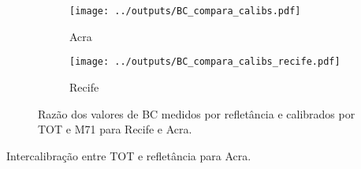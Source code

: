 \begin{figure}[H]
	\centering
	\begin{subfigure}[b]{0.43\linewidth}
		\texttt{[image: ../outputs/BC\_compara\_calibs.pdf]}
		\caption{Acra \label{fig:razaoTOTM71}}
	\end{subfigure}
		\hspace{0.3cm}
	\begin{subfigure}[b]{0.43\linewidth}
		\texttt{[image: ../outputs/BC\_compara\_calibs\_recife.pdf]}
		\caption{Recife \label{fig:BC_compara_recife}}
	\end{subfigure}%

	\caption{Razão dos valores de BC medidos por refletância e calibrados por 
		TOT e M71 para Recife e Acra. \label{fig:BC_compara}}
\end{figure}

\newpage
\begin{table}[H]
	\centering
	\footnotesize 
	
	\caption{Intercalibração entre TOT e refletância para Acra. \label{table:interGanaBC}} 
\end{table} 
\newpage


